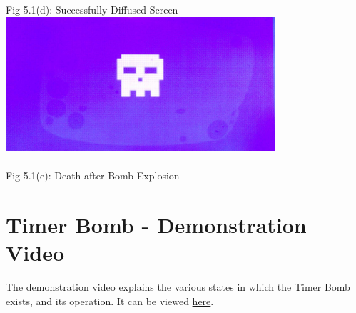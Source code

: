 \documentclass[a4paper,12pt,oneside]{book}
\begin{document}
\begin{center}
\\ {\small Fig 5.1(d): Successfully Diffused Screen} \\
\includegraphics[width=10cm, height=5cm]{TimedBombImages/deathScreen} \\
\\ {\small Fig 5.1(e): Death after Bomb Explosion} \\
\end{center}
\section{Timer Bomb - Demonstration Video}
\qquad The demonstration video explains the various states in which the Timer Bomb exists, and its operation. It can be viewed \href{https://youtu.be/RmcoHzYo_G8}{here}.
\end{document}
